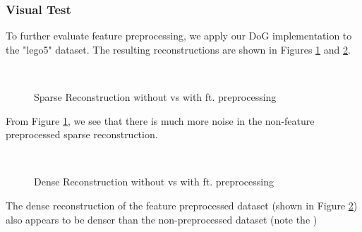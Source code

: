\documentclass[conference,compsoc]{IEEEtran}
\begin{document}
\subsubsection{Visual Test}
To further evaluate feature preprocessing, we apply our DoG implementation to 
the "lego5" dataset. The resulting reconstructions are shown in Figures \ref{fig:ppc_sparse}
and \ref{fig:ppc_dense}. 
\begin{figure}[ht!]
    \centering
    \
    \caption{Sparse Reconstruction without vs with ft. preprocessing}
    \label{fig:ppc_sparse}
\end{figure}
From Figure \ref{fig:ppc_sparse}, we see that there is much more noise in the
non-feature preprocessed sparse reconstruction. 

\begin{figure}[ht!]
    \centering
    \
    \caption{Dense Reconstruction without vs with ft. preprocessing}
    \label{fig:ppc_dense}
\end{figure}
The dense reconstruction of the feature preprocessed dataset (shown in 
Figure \ref{fig:ppc_dense}) also appears to be denser than the non-preprocessed
dataset (note the )
\end{document}
